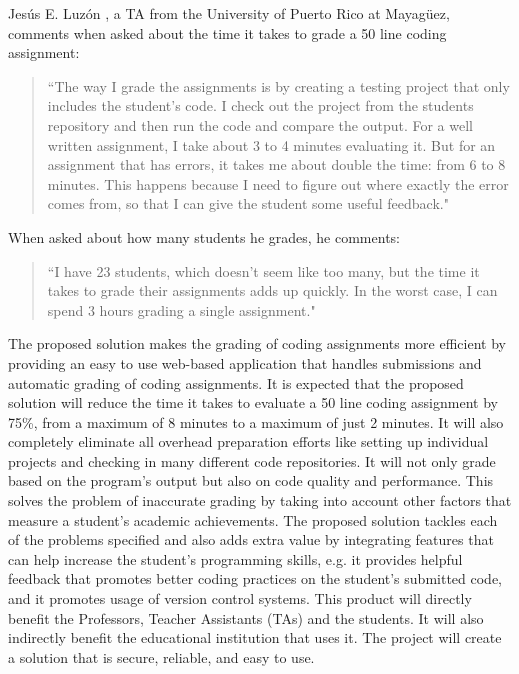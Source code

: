 Jesús E. Luzón \cite{Chiki}, a TA from the University of Puerto Rico at
Mayagüez, comments when asked about the time it takes to grade a 50 line coding
assignment: \begin{quote} ``The way I grade the assignments is by creating a
testing project that only includes the student's code. I check out the project
from the students repository and then run the code and compare the output. For a
well written assignment, I take about 3 to 4 minutes evaluating it. But for an
assignment that has errors, it takes me about double the time: from 6 to 8
minutes. This happens because I need to figure out where exactly the error comes
from, so that I can give the student some useful feedback." \end{quote} When
asked about how many students he grades, he comments: \begin{quote} ``I have 23
students, which doesn't seem like too many, but the time it takes to grade their
assignments adds up quickly. In the worst case, I can spend 3 hours grading a
single assignment." \end{quote}


The proposed solution makes the grading of coding assignments more efficient by
providing an easy to use web-based application that handles submissions and
automatic grading of coding assignments. It is expected that the proposed solution will
reduce the time it takes to evaluate a 50 line coding assignment by 75\%, from a
maximum of 8 minutes to a maximum of just 2 minutes. It will also completely
eliminate all overhead preparation efforts like setting up individual projects
and checking in many different code repositories. It will not only grade based on
the program's output but also on code quality and performance. This solves the
problem of inaccurate grading by taking into account other factors that measure
a student's academic achievements. The proposed solution tackles each of the problems
specified and also adds extra value by integrating features that can help
increase the student's programming skills, e.g. it provides helpful feedback
that promotes better coding practices on the student's submitted code, and it
promotes usage of version control systems. This product will directly benefit
the Professors, Teacher Assistants (TAs) and the students. It will also
indirectly benefit the educational institution that uses it. The project will
create a solution that is secure, reliable, and easy to use.
